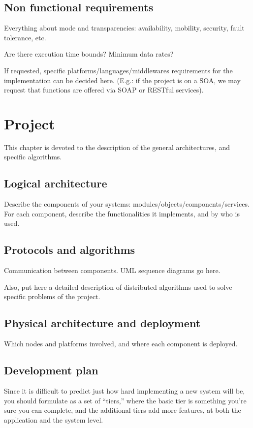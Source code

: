 \documentclass{memoir}
\begin{document}
\section{Non functional requirements}
Everything about mode and transparencies: availability, mobility, security, fault tolerance, etc.

Are there execution time bounds? Minimum data rates?

If requested, specific platforms/languages/middlewares requirements for the implementation can be decided here. (E.g.: if the project is on a SOA, we may request that functions are offered via SOAP or RESTful services). 



\chapter{Project}

This chapter is devoted to the description of the general architectures, and specific algorithms.

\section{Logical architecture}
Describe the components of your systems: modules/objects/components/services.
For each component, describe the functionalities it implements, and by who is used.

\section{Protocols and algorithms}
Communication between components.  UML sequence diagrams go here.

Also, put here a detailed description of distributed algorithms used to solve specific problems of the project.

\section{Physical architecture and deployment}
Which nodes and platforms involved, and where each component is deployed.

\section{Development plan}
Since it is difficult to predict just how hard implementing a new system will be, you should formulate as a set of ``tiers,'' where the basic tier is something you’re sure you can complete, and the additional tiers add more features, at both the application and the system level.
\end{document}
